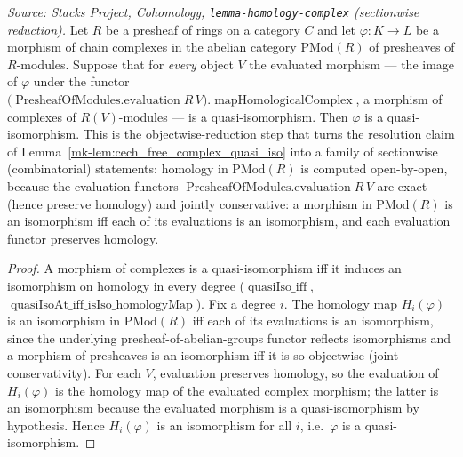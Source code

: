 \begin{lemma}
  \label{mk-lem:quasiIso_of_evaluation}

  \textit{Source: Stacks Project, Cohomology, \texttt{lemma-homology-complex}
  (sectionwise reduction).}
  Let \(R\) be a presheaf of rings on a category \(C\) and let
  \(\varphi : K \to L\) be a morphism of chain complexes in the abelian category
  \(\mathrm{PMod}(R)\) of presheaves of \(R\)-modules. Suppose that for \emph{every}
  object \(V\) the evaluated morphism — the image of \(\varphi\) under the functor
  \(\bigl(\operatorname{PresheafOfModules.evaluation} R\, V\bigr).
  \operatorname{mapHomologicalComplex}\), a morphism of complexes of
  \(R(V)\)-modules — is a quasi-isomorphism. Then \(\varphi\) is a
  quasi-isomorphism. This is the objectwise-reduction step that turns the
  resolution claim of Lemma~\ref{mk-lem:cech_free_complex_quasi_iso} into a family of
  sectionwise (combinatorial) statements: homology in \(\mathrm{PMod}(R)\) is
  computed open-by-open, because the evaluation functors
  \(\operatorname{PresheafOfModules.evaluation} R\, V\) are exact (hence preserve
  homology) and jointly conservative: a morphism in \(\mathrm{PMod}(R)\) is an isomorphism
  iff each of its evaluations is an isomorphism, and each evaluation functor preserves
  homology.
\end{lemma}

\begin{proof}
  A morphism of complexes is a quasi-isomorphism iff it induces an isomorphism on
  homology in every degree (\(\operatorname{quasiIso\_iff}\),
  \(\operatorname{quasiIsoAt\_iff\_isIso\_homologyMap}\)). Fix a degree \(i\). The
  homology map \(H_i(\varphi)\) is an isomorphism in \(\mathrm{PMod}(R)\) iff each of
  its evaluations is an isomorphism, since the underlying
  presheaf-of-abelian-groups functor reflects isomorphisms and a morphism of
  presheaves is an isomorphism iff it is so objectwise (joint conservativity). For
  each \(V\), evaluation preserves homology, so the evaluation of \(H_i(\varphi)\)
  is the homology map of the evaluated complex morphism; the latter is an
  isomorphism because the evaluated morphism is a quasi-isomorphism by hypothesis.
  Hence \(H_i(\varphi)\) is an isomorphism for all \(i\), i.e.\ \(\varphi\) is a
  quasi-isomorphism.
\end{proof}

